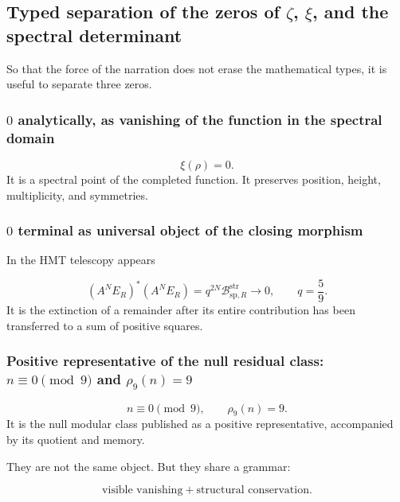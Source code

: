 \subsection{Typed separation of the zeros of \(\zeta\), \(\xi\), and the spectral determinant}
So that the force of the narration does not erase the mathematical types, it is useful to separate three zeros.\par
{}
\subsubsection{\(0\) analytically, as vanishing of the function in the spectral domain}
\[
\xi(\rho)=0.
\]
It is a spectral point of the completed function. It preserves position, height, multiplicity, and symmetries.\par
{}
\subsubsection{\(0\) terminal as universal object of the closing morphism}
In the HMT telescopy appears\par
\[
(A^NE_R)^*(A^NE_R)
=
q^{2N}
\mathcal B_{\mathrm{sp},R}^{\mathrm{str}}
\longrightarrow0,
\qquad
q=\frac59.
\]
It is the extinction of a remainder after its entire contribution has been transferred to a sum of positive squares.\par
{}
\subsubsection{Positive representative of the null residual class: \(n\equiv0\pmod 9\) and \(\rho_9(n)=9\)}
\[
n\equiv0\pmod9,
\qquad
\rho_9(n)=9.
\]
It is the null modular class published as a positive representative, accompanied by its quotient and memory.\par
They are not the same object. But they share a grammar:\par
\[
\text{visible vanishing}
+
\text{structural conservation}.
\]
